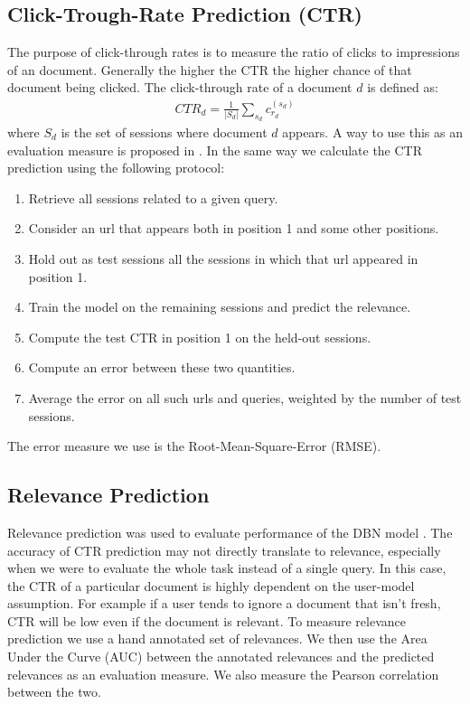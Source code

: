 \subsection{Click-Trough-Rate Prediction (CTR)}
The purpose of click-through rates is to measure the ratio of clicks to impressions of an document.
Generally the higher the CTR the higher chance of that document being clicked.
The click-through rate of a document $d$ is defined as:
\begin{align}
	CTR_d = \frac{1}{|S_d|} \sum_{s_d} c_{r_d}^{(s_d)}
\end{align}
where $S_d$ is the set of sessions where document $d$ appears.
A way to use this as an evaluation measure is proposed in \cite[p. 4]{Chapelle2009}. In the same way we calculate the CTR prediction using the following protocol:
\begin{enumerate}
	\item Retrieve all sessions related to a given query.
	\item Consider an url that appears both in position 1 and some other positions.
	\item Hold out as test sessions all the sessions in which that url appeared in position 1.
	\item Train the model on the remaining sessions and predict the relevance.
	\item Compute the test CTR in position 1 on the held-out sessions.
	\item Compute an error between these two quantities.
	\item Average the error on all such urls and queries, weighted by the number of test sessions.
\end{enumerate}

The error measure we use is the Root-Mean-Square-Error (RMSE).

\subsection{Relevance Prediction}
Relevance prediction was used to evaluate performance of the DBN model \cite[p. 6]{Chapelle2009}.
The accuracy of CTR prediction may not directly translate to relevance, especially when we were to evaluate the whole task instead of a single query.
In this case, the CTR of a particular document is highly dependent on the user-model assumption.
For example if a user tends to ignore a document that isn't fresh, CTR will be low even if the document is relevant.
To measure relevance prediction we use a hand annotated set of relevances. We then use the Area Under the Curve (AUC) between the annotated relevances and the predicted relevances as an evaluation measure. We also measure the Pearson correlation between the two. 

